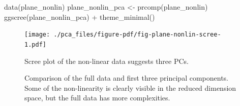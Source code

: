 \documentclass[
  letterpaper,
]{book}
\newenvironment{Shaded}{\begin{snugshade}}{\end{snugshade}}
\newcommand{\AttributeTok}[1]{\textcolor[rgb]{0.40,0.45,0.13}{#1}}
\newcommand{\DecValTok}[1]{\textcolor[rgb]{0.68,0.00,0.00}{#1}}
\newcommand{\FloatTok}[1]{\textcolor[rgb]{0.68,0.00,0.00}{#1}}
\newcommand{\FunctionTok}[1]{\textcolor[rgb]{0.28,0.35,0.67}{#1}}
\newcommand{\NormalTok}[1]{\textcolor[rgb]{0.00,0.23,0.31}{#1}}
\newcommand{\OtherTok}[1]{\textcolor[rgb]{0.00,0.23,0.31}{#1}}
\newcommand{\SpecialCharTok}[1]{\textcolor[rgb]{0.37,0.37,0.37}{#1}}
\newcommand{\StringTok}[1]{\textcolor[rgb]{0.13,0.47,0.30}{#1}}
\begin{document}
\begin{Shaded}
\begin{Highlighting}[]
\FunctionTok{data}\NormalTok{(plane\_nonlin)}
\NormalTok{plane\_nonlin\_pca }\OtherTok{\textless{}{-}} \FunctionTok{prcomp}\NormalTok{(plane\_nonlin)}
\FunctionTok{ggscree}\NormalTok{(plane\_nonlin\_pca) }\SpecialCharTok{+} \FunctionTok{theme\_minimal}\NormalTok{()}
\end{Highlighting}
\end{Shaded}

\begin{figure}[H]

{\centering \texttt{[image: ./pca\_files/figure-pdf/fig-plane-nonlin-scree-1.pdf]}

}

\caption{\label{fig-plane-nonlin-scree}Scree plot of the non-linear data
suggests three PCs.}

\end{figure}

\begin{Shaded}
\end{Shaded}

\begin{figure}

\begin{minipage}[t]{0.50\linewidth}

{\centering 

}

\end{minipage}%

\caption{\label{fig-plane-nonlin}Comparison of the full data and first
three principal components. Some of the non-linearity is clearly visible
in the reduced dimension space, but the full data has more
complexities.}

\end{figure}
\end{document}
